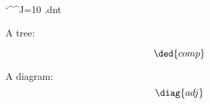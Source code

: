 \documentclass[oneside]{book}
\begin{document}
\ifluatex
  \catcode`\^^J=10
\else
  \jobname.dnt
  \def\pu{}
\fi

A tree:
%
%
\pu
$$\ded{comp}$$



\def\catA{\mathbf{A}}
\def\catB{\mathbf{B}}

A diagram:
%
$$\pu
  \diag{adj}
$$


\pu
\end{document}
